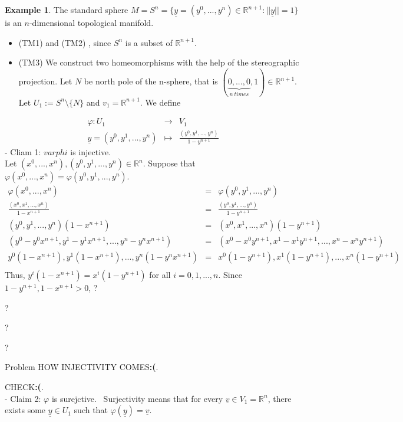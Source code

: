 \documentclass[
]{book}
\providecommand{\tightlist}{%
  \setlength{\itemsep}{0pt}\setlength{\parskip}{0pt}}
\theoremstyle{definition}
\theoremstyle{definition}
\newtheorem{example}{Example}[chapter]
\theoremstyle{definition}
\theoremstyle{definition}
\theoremstyle{remark}
\begin{document}
\begin{example}
\protect\hypertarget{exm:unnamed-chunk-9}{}\label{exm:unnamed-chunk-9}The standard sphere \(M = S^n = \{ \underline{y}=(y^0,...,y^{n}) \in \mathbb{R}^{n+1} : ||\underline{y}|| = 1 \}\) is an \(n\)-dimensional topological manifold.

\begin{itemize}
\tightlist
\item
  (TM1) and (TM2) , since \(S^n\) is a subset of \(\mathbb{R}^{n+1}\).
\item
  (TM3) We construct two homeomorphisms with the help of the stereographic projection. Let \(N\) be north pole of the n-sphere, that is \((\underbrace{0,...,0}_{n~times},1)\in \mathbb{R}^{n+1}\). Let \(U_1:=S^n\setminus \{N\}\) and \(v_1=\mathbb{R}^{n+1}\). We define
\end{itemize}

\begin{eqnarray}
\varphi:U_1&\to & V_1\\
\underline{y} =(y^0,y^1,...,y^n) & \mapsto & \frac{(y^0,y^1,...,y^n)}{1-y^{n+1}}
\end{eqnarray}
- Cliam 1: \(varphi\) is injective.\\
Let \((x^0,...,x^{n}),(y^0,y^1,...,y^n)\in \mathbb{R}^n\). Suppose that \(\varphi(x^0,...,x^{n})=\varphi(y^0,y^1,...,y^n)\).
\begin{eqnarray}
\varphi(x^0,...,x^{n})&=&\varphi(y^0,y^1,...,y^n)\\
\frac{(x^0,x^1,...,x^n)}{1-x^{n+1}}&=&\frac{(y^0,y^1,...,y^n)}{1-y^{n+1}}\\
(y^0, y^1, ..., y^n)(1-x^{n+1}) &=& (x^0, x^1, ..., x^n)(1-y^{n+1})\\
(y^0 - y^0x^{n+1}, y^1 - y^1x^{n+1}, ..., y^n - y^nx^{n+1}) &=& (x^0 - x^0y^{n+1}, x^1 - x^1y^{n+1}, ..., x^n - x^ny^{n+1})\\
y^0(1 - x^{n+1}), y^1(1 - x^{n+1}), ..., y^n (1- y^nx^{n+1}) &=&  x^0(1-y^{n+1}), x^1(1 - y^{n+1}), ..., x^n (1- y^{n+1})\\
\end{eqnarray}
Thus, \(y^i(1 - x^{n+1}) = x^i(1 -y^{n+1})\) for all \(i = 0, 1, ..., n\).
Since \(1 - y^{n+1}, 1 - x^{n+1} > 0\),
?

?

?

?

{Problem HOW INJECTIVITY COMES\textbf{:(}}.

{CHECK\textbf{:(}}.\\
- Claim 2: \(\varphi\) is surejctive.~
Surjectivity means that for every \(\underline{v} \in V_1 = \mathbb{R}^n\), there exists some \(\underline{y} \in U_1\) such that \(\varphi(\underline{y}) = \underline{v}\).


\end{example}
\end{document}
